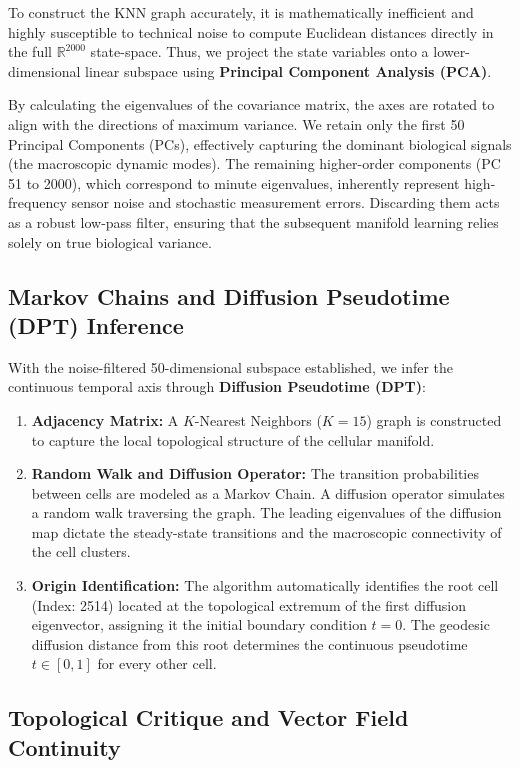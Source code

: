 \documentclass[12pt, a4paper]{article}
\begin{document}
	To construct the KNN graph accurately, it is mathematically inefficient and highly susceptible to technical noise to compute Euclidean distances directly in the full $\mathbb{R}^{2000}$ state-space. Thus, we project the state variables onto a lower-dimensional linear subspace using \textbf{Principal Component Analysis (PCA)}. 
	
	By calculating the eigenvalues of the covariance matrix, the axes are rotated to align with the directions of maximum variance. We retain only the first 50 Principal Components (PCs), effectively capturing the dominant biological signals (the macroscopic dynamic modes). The remaining higher-order components (PC 51 to 2000), which correspond to minute eigenvalues, inherently represent high-frequency sensor noise and stochastic measurement errors. Discarding them acts as a robust low-pass filter, ensuring that the subsequent manifold learning relies solely on true biological variance.
	
	\subsection{Markov Chains and Diffusion Pseudotime (DPT) Inference}
	
	With the noise-filtered 50-dimensional subspace established, we infer the continuous temporal axis through \textbf{Diffusion Pseudotime (DPT)}:
	\begin{enumerate}
		\item \textbf{Adjacency Matrix:} A $K$-Nearest Neighbors ($K=15$) graph is constructed to capture the local topological structure of the cellular manifold.
		\item \textbf{Random Walk and Diffusion Operator:} The transition probabilities between cells are modeled as a Markov Chain. A diffusion operator simulates a random walk traversing the graph. The leading eigenvalues of the diffusion map dictate the steady-state transitions and the macroscopic connectivity of the cell clusters.
		\item \textbf{Origin Identification:} The algorithm automatically identifies the root cell (Index: 2514) located at the topological extremum of the first diffusion eigenvector, assigning it the initial boundary condition $t = 0$. The geodesic diffusion distance from this root determines the continuous pseudotime $t \in [0, 1]$ for every other cell.
	\end{enumerate}
	
	\subsection{Topological Critique and Vector Field Continuity}
	
\end{document}
